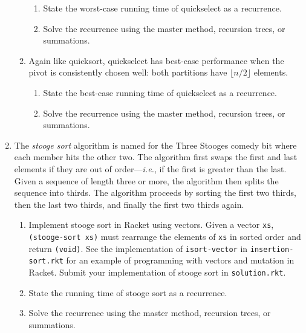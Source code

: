 \documentclass{article}
\begin{document}
\begin{enumerate}
\begin{enumerate}
\begin{enumerate}
    \item State the worst-case running time of quickselect as a recurrence.
    \item Solve the recurrence using the master method, recursion trees, or
      summations.
    \end{enumerate}
  \item
    Again like quicksort, quickselect has best-case performance when the pivot
    is consistently chosen well: both partitions have \(\lfloor{n/2}\rfloor\)
    elements.
    \begin{enumerate}
    \item State the best-case running time of quickselect as a recurrence.
    \item Solve the recurrence using the master method, recursion trees, or
      summations.
    \end{enumerate}
  \end{enumerate}

  \pagebreak[2]
\item
  The \emph{stooge sort} algorithm is named for the Three Stooges comedy bit
  where each member hits the other two.  The algorithm first swaps the first and
  last elements if they are out of order---\emph{i.e.}, if the first is greater
  than the last.  Given a sequence of length three or more, the algorithm then
  splits the sequence into thirds.  The algorithm proceeds by sorting the first
  two thirds, then the last two thirds, and finally the first two thirds again.
  \begin{enumerate}
  \item Implement stooge sort in Racket using vectors.  Given a vector
    \texttt{xs}, \mbox{\texttt{(stooge-sort~xs)}} must rearrange the elements of
    \texttt{xs} in sorted order and return \texttt{(void)}.  See the
    implementation of \texttt{isort-vector} in \texttt{insertion-sort.rkt} for
    an example of programming with vectors and mutation in Racket.  Submit your
    implementation of stooge sort in \texttt{solution.rkt}.
  \item State the running time of stooge sort as a recurrence.
  \item Solve the recurrence using the master method, recursion trees, or
    summations.
  \end{enumerate}


\end{enumerate}
\end{document}
